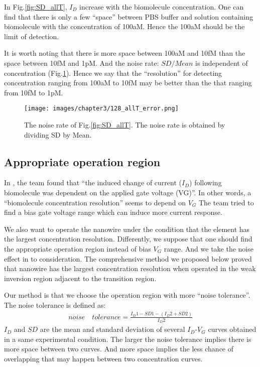 In Fig.\ref{fig:SD_allT}, $I_D$ increase with the biomolecule concentration.
One can find that there is only a few ``space'' between PBS buffer and solution containing biomolecule with the concentration of 100aM.
Hence the 100aM should be the limit of detection.

It is worth noting that there is more space between 100aM and 10fM than the space between 10fM and 1pM.
And the noise rate: ${SD} / {Mean}$ is independent of concentration (Fig.\ref{fig:SD_allT2}).
Hence we say that the ``resolution'' for detecting concentration ranging from 100aM to 10fM may be better than the that ranging from 10fM to 1pM.
\begin{figure}[!htbp]
        \texttt{[image: images/chapter3/128\_allT\_error.png]}
    \caption{The noise rate of Fig.\ref{fig:SD_allT}. The noise rate is obtained by dividing SD by Mean.}
    \label{fig:SD_allT2}
\end{figure}

\subsection{Appropriate operation region} \label{section:biasVg}
In \cite{C6}, the team found that ``the induced change of current ($I_D$) following biomolecule was dependent on the applied gate voltage (VG)''.
In other words, a ``biomolecule concentration resolution'' seems to depend on $V_G$
The team tried to find a bias gate voltage range which can induce more current response.

We also want to operate the nanowire under the condition that the element has the largest concentration resolution.
Differently, we suppose that one should find the appropriate operation region instead of bias $V_G$ range.
And we take the noise effect in to consideration.
The comprehensive method we proposed below proved that nanowire has the largest concentration resolution when operated in the weak inversion region adjacent to the transition region.

Our method is that we choose the operation region with more ``noise tolerance''.
The noise tolerance is defined as:
\setlength{\mathindent}{2cm}
\begin{align}
    noise \quad tolerance = \frac{I_D1 - SD1 - (I_D2 + SD2)}{I_D2}
\end{align}
$I_D$ and $SD$ are the mean and standard deviation of several $I_D$-$V_G$ curves obtained in a same experimental condition.
The larger the noise tolerance implies there is more space between two curves.
And more space implies the less chance of overlapping that may happen between two concentration curves.

